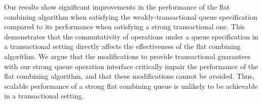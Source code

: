
Our results show significant improvements in the performance of the flat combining algorithm when satisfying the weakly-transactional queue specification compared to its performance when satisfying a strong transactional one. This demonstrates that the commutativity of operations under a queue specification in a transactional setting directly affects the effectiveness of the flat combining algorithm. We argue that the modifications to provide transactional guarantees with our strong queue operation interface critically impair the performance of the flat combining algorithm, and that these modifications cannot be avoided. Thus, scalable performance of a strong flat combining queue is unlikely to be achievable in a transactional setting.
